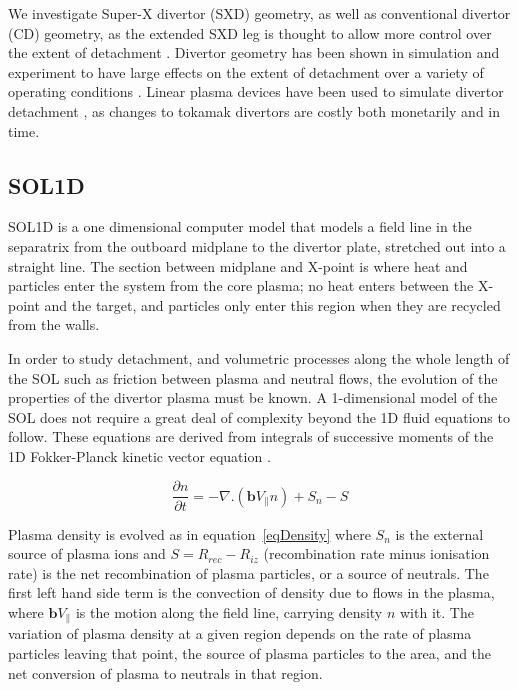 \documentclass[12pt]{article}  %
\begin{document}
We investigate Super-X divertor (SXD) geometry, as well as conventional divertor (CD) geometry, as the extended SXD leg is thought to allow more control over the extent of detachment \cite{Valanju2009}. Divertor geometry has been shown in simulation and experiment to have large effects on the extent of detachment over a variety of operating conditions \cite{Pitts2001}. Linear plasma devices have been used to simulate divertor detachment \cite{Nishijima2002, Ohno2002}, as changes to tokamak divertors are costly both monetarily and in time.

\subsection{SOL1D}\label{ssecSOL1D}
SOL1D is a one dimensional computer model that models a field line in the separatrix from the outboard midplane to the divertor plate, stretched out into a straight line. The section between midplane and X-point is where heat and particles enter the system from the core plasma; no heat enters between the X-point and the target, and particles only enter this region when they are recycled from the walls.

In order to study detachment, and volumetric processes along the whole length of the SOL such as friction between plasma and neutral flows, the evolution of the properties of the divertor plasma must be known. A 1-dimensional model of the SOL does not require a great deal of complexity beyond the 1D fluid equations to follow. These equations are derived from integrals of successive moments of the 1D Fokker-Planck kinetic vector equation \cite{Stangeby}.

  \begin{equation}\label{eqDensity}
  \frac{\partial n}{\partial t} = -\nabla . (\textbf{b}V_{\parallel}n) + S_n - S
  \end{equation}

Plasma density is evolved as in equation~\ref{eqDensity} where $S_n$ is the external source of plasma ions and $S=R_{rec} - R_{iz}$ (recombination rate minus ionisation rate) is the net recombination of plasma particles, or a source of neutrals. The first left hand side term is the convection of density due to flows in the plasma, where $\textbf{b}V_{\parallel}$ is the motion along the field line, carrying density $n$ with it. The variation of plasma density at a given region depends on the rate of plasma particles leaving that point, the source of plasma particles to the area, and the net conversion of plasma to neutrals in that region.
\end{document}
